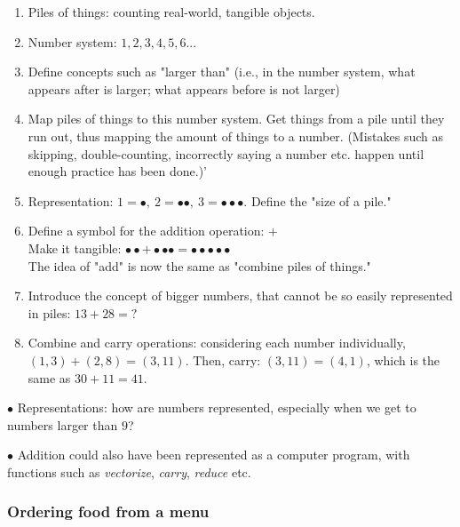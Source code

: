 \documentclass[english,openany]{book}
\begin{document}
\begin{enumerate}
    \item Piles of things: counting real-world, tangible objects.

    \item Number system: $1, 2, 3, 4, 5, 6...$

    \item Define concepts such as "larger than" (i.e., in the number system, what appears after is larger; what appears before is not larger)
    
    \item Map piles of things to this number system. Get things from a pile until they run out, thus mapping the amount of things to a number. (Mistakes such as skipping, double-counting, incorrectly saying a number etc. happen until enough practice has been done.)'
    
    \item Representation: $1 = \bullet,\ 2 = \bullet \bullet,\ 3 = \bullet \bullet \bullet$. Define the "size of a pile."
    
    \item Define a symbol for the addition operation: $+$\\ Make it tangible: $\bullet \bullet + \bullet \bullet \bullet = \bullet \bullet \bullet \bullet \bullet$\\
    The idea of "add" is now the same as "combine piles of things."
    
    \item Introduce the concept of bigger numbers, that cannot be so easily represented in piles: $13 + 28 = ?$
    
    \item Combine and carry operations: considering each number individually, $(1, 3) + (2, 8) = (3, 11)$. Then, carry: $(3, 11) = (4, 1)$, which is the same as $30 + 11 = 41$.
\end{enumerate}

$\bullet$ Representations: how are numbers represented, especially when we get to numbers larger than $9$?

$\bullet$ Addition could also have been represented as a computer program, with functions such as \textit{vectorize}, \textit{carry}, \textit{reduce} etc.

\subsubsection{Ordering food from a menu}
\end{document}
